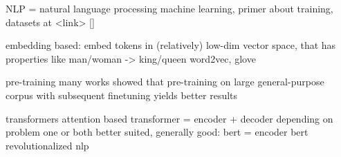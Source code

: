 NLP = natural language processing
machine learning, primer about training, datasets at <link> []

embedding based: embed tokens in (relatively) low-dim vector space,
that has properties like man/woman -> king/queen
word2vec, glove

pre-training
many works showed that pre-training on large general-purpose corpus with
subsequent finetuning yields better results~\cite{}

transformers
attention based
transformer = encoder + decoder
depending on problem one or both better suited, generally good: bert = encoder
bert revolutionalized nlp
